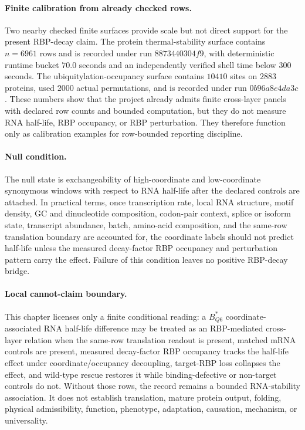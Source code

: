 \paragraph{Finite calibration from already checked rows.}
Two nearby checked finite surfaces provide scale but not direct support for the present RBP-decay claim.  The protein thermal-stability surface contains $n=6961$ rows and is recorded under run $8873440304f9$, with deterministic runtime bucket $70.0$ seconds and an independently verified shell time below $300$ seconds.  The ubiquitylation-occupancy surface contains $10410$ sites on $2883$ proteins, used $2000$ actual permutations, and is recorded under run $0b96a8e4da3c$.  These numbers show that the project already admits finite cross-layer panels with declared row counts and bounded computation, but they do not measure RNA half-life, RBP occupancy, or RBP perturbation.  They therefore function only as calibration examples for row-bounded reporting discipline.

\paragraph{Null condition.}
The null state is exchangeability of high-coordinate and low-coordinate synonymous windows with respect to RNA half-life after the declared controls are attached.  In practical terms, once transcription rate, local RNA structure, motif density, GC and dinucleotide composition, codon-pair context, splice or isoform state, transcript abundance, batch, amino-acid composition, and the same-row translation boundary are accounted for, the coordinate labels should not predict half-life unless the measured decay-factor RBP occupancy and perturbation pattern carry the effect.  Failure of this condition leaves no positive RBP-decay bridge.

\paragraph{Local cannot-claim boundary.}
This chapter licenses only a finite conditional reading: a $B^{*}_{Q6}$ coordinate-associated RNA half-life difference may be treated as an RBP-mediated cross-layer relation when the same-row translation readout is present, matched mRNA controls are present, measured decay-factor RBP occupancy tracks the half-life effect under coordinate/occupancy decoupling, target-RBP loss collapses the effect, and wild-type rescue restores it while binding-defective or non-target controls do not.  Without those rows, the record remains a bounded RNA-stability association.  It does not establish translation, mature protein output, folding, physical admissibility, function, phenotype, adaptation, causation, mechanism, or universality.
